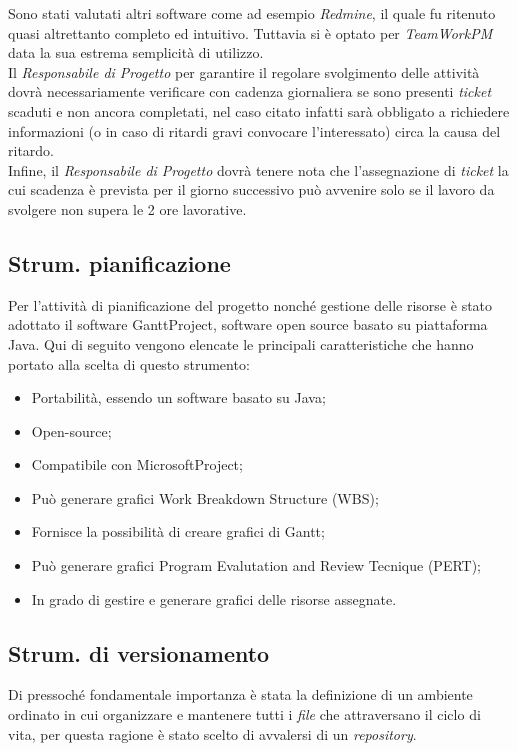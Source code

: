 Sono stati valutati altri software come ad esempio \textit{Redmine}, il quale fu ritenuto quasi altrettanto completo ed intuitivo. Tuttavia si è optato per \textit{TeamWorkPM} data la sua estrema semplicità di utilizzo.\\
Il \textit{Responsabile di Progetto} per garantire il regolare svolgimento delle attività dovrà necessariamente verificare con cadenza giornaliera se sono presenti \textit{ticket} scaduti e non ancora completati, nel caso citato infatti sarà obbligato a richiedere informazioni (o in caso di ritardi gravi convocare l'interessato) circa la causa del ritardo.\\
Infine, il \textit{Responsabile di Progetto} dovrà tenere nota che l'assegnazione di \textit{ticket} la cui scadenza è prevista per il giorno successivo può avvenire solo se il lavoro da svolgere non supera le 2 ore lavorative.

\subsection{Strum. pianificazione}
Per l'attività di pianificazione del progetto nonché gestione delle risorse è stato adottato il software GanttProject, software open source basato su piattaforma Java. Qui di seguito vengono elencate le principali caratteristiche che hanno portato alla scelta di questo strumento:
\begin{itemize}
\item Portabilità, essendo un software basato su Java;
\item Open-source;
\item Compatibile con MicrosoftProject;
\item Può generare grafici Work Breakdown Structure (WBS);
\item Fornisce la possibilità di creare grafici di Gantt;
\item Può generare grafici Program Evalutation and Review Tecnique (PERT);
\item In grado di gestire e generare grafici delle risorse assegnate.
\end{itemize}
\subsection{Strum. di versionamento}
Di pressoché fondamentale importanza è stata la definizione di un ambiente ordinato in cui organizzare e mantenere tutti i \textit{file} che attraversano il ciclo di vita, per questa ragione è stato scelto di avvalersi di un \textit{repository}. 

